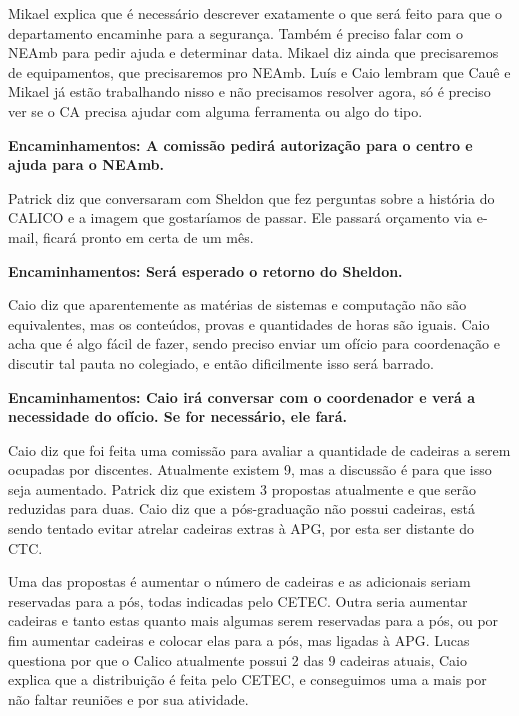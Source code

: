 \documentclass{ata-calico}
\begin{document}
\maketitle

Mikael explica que é necessário descrever exatamente o que será feito para que o departamento encaminhe para a segurança. Também é preciso falar com o NEAmb para pedir ajuda e determinar data. Mikael diz ainda que precisaremos de equipamentos, que precisaremos pro NEAmb. Luís e Caio lembram que Cauê e Mikael já estão trabalhando nisso e não precisamos resolver agora, só é preciso ver se o CA precisa ajudar com alguma ferramenta ou algo do tipo.\newline

 \textbf{Encaminhamentos: A comissão pedirá autorização para o centro e ajuda para o NEAmb.}

Patrick diz que conversaram com Sheldon que fez perguntas sobre a história do CALICO e a imagem que gostaríamos de passar. Ele passará orçamento via e-mail, ficará pronto em certa de um mês.\newline

\textbf{Encaminhamentos: Será esperado o retorno do Sheldon.}

Caio diz que aparentemente as matérias de sistemas e computação não são equivalentes, mas os conteúdos, provas e quantidades de horas são iguais. Caio acha que é algo fácil de fazer, sendo preciso enviar um ofício para coordenação e discutir tal pauta no colegiado, e então dificilmente isso será barrado.\newline

 \textbf{Encaminhamentos: Caio irá conversar com o coordenador e verá a necessidade do ofício. Se for necessário, ele fará.}

Caio diz que foi feita uma comissão para avaliar a quantidade de cadeiras a serem ocupadas por discentes. Atualmente existem 9, mas a discussão é para que isso seja aumentado. Patrick diz que existem 3 propostas atualmente e que serão reduzidas para duas. Caio diz que a pós-graduação não possui cadeiras, está sendo tentado evitar atrelar cadeiras extras à APG, por esta ser distante do CTC.

Uma das propostas é aumentar o número de cadeiras e as adicionais seriam reservadas para a pós, todas indicadas pelo CETEC. Outra seria aumentar cadeiras e tanto estas quanto mais algumas serem reservadas para a pós, ou por fim aumentar cadeiras e colocar elas para a pós, mas ligadas à APG. Lucas questiona por que o Calico atualmente possui 2 das 9 cadeiras atuais, Caio explica que a distribuição é feita pelo CETEC, e conseguimos uma a mais por não faltar reuniões e por sua atividade.\newline
\end{document}
